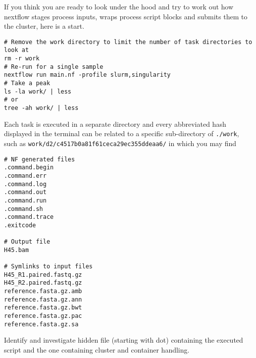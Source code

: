 If you think you are ready to look under the hood and try to work out how nextflow stages process inputs, wraps process script blocks and submits them to the cluster, here is a start. 

\begin{advanced}
\begin{lstlisting}
# Remove the work directory to limit the number of task directories to look at
rm -r work
# Re-run for a single sample
nextflow run main.nf -profile slurm,singularity
# Take a peak
ls -la work/ | less
# or
tree -ah work/ | less
\end{lstlisting}

Each task is executed in a separate directory and every abbreviated hash displayed in the terminal can be related to a specific sub-directory of \texttt{./work},\\ such as
\texttt{work/d2/c4517b0a81f61ceca29ec355ddeaa6/} in which you may find

\begin{lstlisting}
# NF generated files
.command.begin
.command.err
.command.log
.command.out
.command.run
.command.sh
.command.trace
.exitcode

# Output file
H45.bam

# Symlinks to input files
H45_R1.paired.fastq.gz
H45_R2.paired.fastq.gz
reference.fasta.gz.amb
reference.fasta.gz.ann
reference.fasta.gz.bwt
reference.fasta.gz.pac
reference.fasta.gz.sa
\end{lstlisting}

Identify and investigate hidden file (starting with dot) containing the executed script and the one containing cluster and container handling. 

%
%

\end{advanced}




